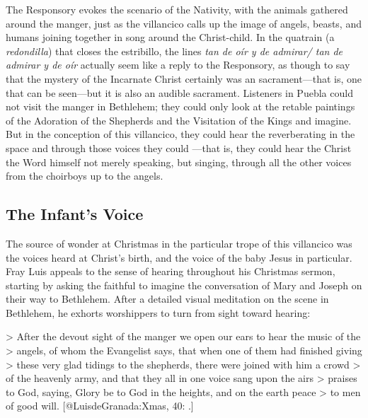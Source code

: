 The Responsory evokes the scenario of the Nativity, with the animals gathered
around the manger, just as the villancico calls up the image of angels, beasts,
and humans joining together in song around the Christ-child.
In the quatrain (a \emph{redondilla}) that closes the estribillo, the lines
\emph{tan de
oír y de admirar/ tan de admirar y de oír} actually seem like a reply to the
Responsory, as though to say that the mystery of the Incarnate Christ certainly
was an  sacrament---that is, one that can be seen---but it is also an
audible sacrament.
Listeners in Puebla could not visit the manger in Bethlehem; they could only look
at the retable paintings of the Adoration of the Shepherds and the Visitation of
the Kings and imagine.
But in the conception of this villancico, they could hear the  reverberating in the space and through those voices they could
---that is, they
could hear the Christ the Word himself not merely speaking, but singing, through
all the other voices from the choirboys up to the angels.

\subsection{The Infant's Voice}

The source of wonder at Christmas in the particular trope of this villancico was
the voices heard at Christ's birth, and the voice of the baby Jesus in particular.
Fray Luis appeals to the sense of hearing throughout his Christmas sermon,
starting by asking the faithful to imagine the conversation of Mary and Joseph
on their way to Bethlehem.
After a detailed visual meditation on the scene in Bethlehem, he exhorts
worshippers to turn from sight toward hearing:

> After the devout sight of the manger we open our ears to hear the music of the
> angels, of whom the Evangelist says, that when one of them had finished giving
> these very glad tidings to the shepherds, there were joined with him a crowd
> of the heavenly army, and that they all in one voice sang upon the airs
> praises to God, saying, Glory be to God in the heights, and on the earth peace
> to men of good will.
[@LuisdeGranada:Xmas, 40:
.]

